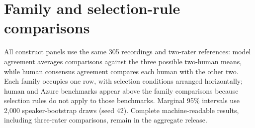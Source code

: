 \documentclass[10pt]{article}
\begin{document}
\appendix
\section{Family and selection-rule comparisons}\label{sec:fulltables}\label{sec:selectionrules}
All construct panels use the same 305 recordings and two-rater references: model agreement averages comparisons against the three possible two-human means, while human consensus agreement compares each human with the other two. Each family occupies one row, with selection conditions arranged horizontally; human and Azure benchmarks appear above the family comparisons because selection rules do not apply to those benchmarks. Marginal 95\% intervals use 2,000 speaker-bootstrap draws (seed 42). Complete machine-readable results, including three-rater comparisons, remain in the aggregate release.
\end{document}
